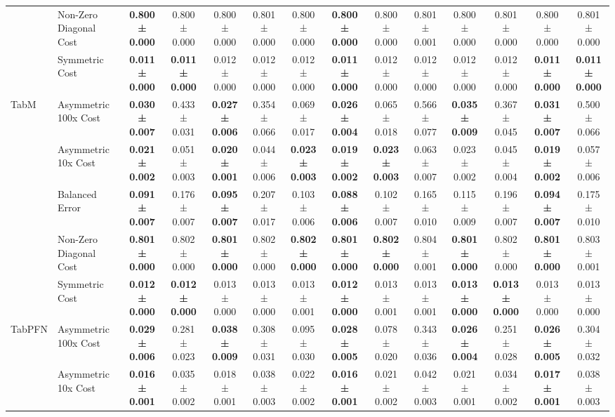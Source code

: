 \begin{table}[H]
{\begin{tabular}{llcccccccccccc}
 & Non-Zero Diagonal Cost & \textbf{0.800 ± 0.000} & 0.800 ± 0.000 & 0.800 ± 0.000 & 0.801 ± 0.000 & 0.800 ± 0.000 & \textbf{0.800 ± 0.000} & 0.800 ± 0.000 & 0.801 ± 0.001 & 0.800 ± 0.000 & 0.801 ± 0.000 & 0.800 ± 0.000 & 0.801 ± 0.000 \\
 & Symmetric Cost & \textbf{0.011 ± 0.000} & \textbf{0.011 ± 0.000} & 0.012 ± 0.000 & 0.012 ± 0.000 & 0.012 ± 0.000 & \textbf{0.011 ± 0.000} & 0.012 ± 0.000 & 0.012 ± 0.000 & 0.012 ± 0.000 & 0.012 ± 0.000 & \textbf{0.011 ± 0.000} & \textbf{0.011 ± 0.000} \\
\cline{1-14}
\multirow[t]{5}{*}{TabM} & Asymmetric 100x Cost & \textbf{0.030 ± 0.007} & 0.433 ± 0.031 & \textbf{0.027 ± 0.006} & 0.354 ± 0.066 & 0.069 ± 0.017 & \textbf{0.026 ± 0.004} & 0.065 ± 0.018 & 0.566 ± 0.077 & \textbf{0.035 ± 0.009} & 0.367 ± 0.045 & \textbf{0.031 ± 0.007} & 0.500 ± 0.066 \\
 & Asymmetric 10x Cost & \textbf{0.021 ± 0.002} & 0.051 ± 0.003 & \textbf{0.020 ± 0.001} & 0.044 ± 0.006 & \textbf{0.023 ± 0.003} & \textbf{0.019 ± 0.002} & \textbf{0.023 ± 0.003} & 0.063 ± 0.007 & 0.023 ± 0.002 & 0.045 ± 0.004 & \textbf{0.019 ± 0.002} & 0.057 ± 0.006 \\
 & Balanced Error & \textbf{0.091 ± 0.007} & 0.176 ± 0.007 & \textbf{0.095 ± 0.007} & 0.207 ± 0.017 & 0.103 ± 0.006 & \textbf{0.088 ± 0.006} & 0.102 ± 0.007 & 0.165 ± 0.010 & 0.115 ± 0.009 & 0.196 ± 0.007 & \textbf{0.094 ± 0.007} & 0.175 ± 0.010 \\
 & Non-Zero Diagonal Cost & \textbf{0.801 ± 0.000} & 0.802 ± 0.000 & \textbf{0.801 ± 0.000} & 0.802 ± 0.000 & \textbf{0.802 ± 0.000} & \textbf{0.801 ± 0.000} & \textbf{0.802 ± 0.000} & 0.804 ± 0.001 & \textbf{0.801 ± 0.000} & 0.802 ± 0.000 & \textbf{0.801 ± 0.000} & 0.803 ± 0.001 \\
 & Symmetric Cost & \textbf{0.012 ± 0.000} & \textbf{0.012 ± 0.000} & 0.013 ± 0.000 & 0.013 ± 0.000 & 0.013 ± 0.001 & \textbf{0.012 ± 0.000} & 0.013 ± 0.001 & 0.013 ± 0.001 & \textbf{0.013 ± 0.000} & \textbf{0.013 ± 0.000} & 0.013 ± 0.000 & 0.013 ± 0.000 \\
\cline{1-14}
\multirow[t]{5}{*}{TabPFN} & Asymmetric 100x Cost & \textbf{0.029 ± 0.006} & 0.281 ± 0.023 & \textbf{0.038 ± 0.009} & 0.308 ± 0.031 & 0.095 ± 0.030 & \textbf{0.028 ± 0.005} & 0.078 ± 0.020 & 0.343 ± 0.036 & \textbf{0.026 ± 0.004} & 0.251 ± 0.028 & \textbf{0.026 ± 0.005} & 0.304 ± 0.032 \\
 & Asymmetric 10x Cost & \textbf{0.016 ± 0.001} & 0.035 ± 0.002 & 0.018 ± 0.001 & 0.038 ± 0.003 & 0.022 ± 0.002 & \textbf{0.016 ± 0.001} & 0.021 ± 0.002 & 0.042 ± 0.003 & 0.021 ± 0.001 & 0.034 ± 0.002 & \textbf{0.017 ± 0.001} & 0.038 ± 0.003 \\

\end{tabular}}
\end{table}
